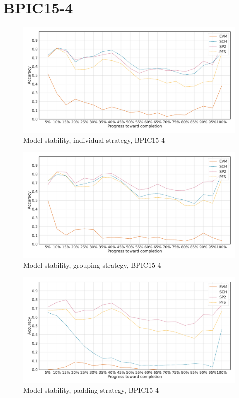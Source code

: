 \section*{BPIC15-4}\label{appendix:stability:2015-4}
\begin{figure}[!htb]
    \centering
    \includegraphics[width=\textwidth]{gfx/bpic2015_4/individual_stability.pdf}
    \caption{Model stability, individual strategy, BPIC15-4}
    \label{fig:bpic15-4-individual-stability}
\end{figure}
\begin{figure}[!htb]
    \centering
    \includegraphics[width=\textwidth]{gfx/bpic2015_4/grouped_stability.pdf}
    \caption{Model stability, grouping strategy, BPIC15-4}
    \label{fig:bpic15-4-grouped-stability}
\end{figure}
\begin{figure}[!htb]
    \centering
    \includegraphics[width=\textwidth]{gfx/bpic2015_4/padded_stability.pdf}
    \caption{Model stability, padding strategy, BPIC15-4}
    \label{fig:bpic15-4-padded-stability}
\end{figure}
